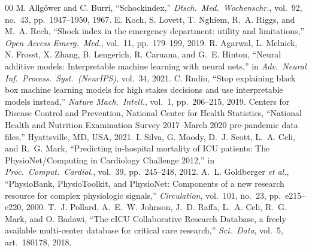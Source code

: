 \documentclass[conference]{IEEEtran}
\begin{document}
\begin{thebibliography}{00}
 M. Allg\"{o}wer and C. Burri, ``Schockindex,'' \textit{Dtsch.\ Med.\ Wochenschr.}, vol.~92, no.~43, pp.~1947--1950, 1967.
 E. Koch, S. Lovett, T. Nghiem, R.~A. Riggs, and M.~A. Rech, ``Shock index in the emergency department: utility and limitations,'' \textit{Open Access Emerg.\ Med.}, vol.~11, pp.~179--199, 2019.
 R. Agarwal, L. Melnick, N. Frosst, X. Zhang, B. Lengerich, R. Caruana, and G.~E. Hinton, ``Neural additive models: Interpretable machine learning with neural nets,'' in \textit{Adv.\ Neural Inf.\ Process.\ Syst.\ (NeurIPS)}, vol.~34, 2021.
 C. Rudin, ``Stop explaining black box machine learning models for high stakes decisions and use interpretable models instead,'' \textit{Nature Mach.\ Intell.}, vol.~1, pp.~206--215, 2019.
 Centers for Disease Control and Prevention, National Center for Health Statistics, ``National Health and Nutrition Examination Survey 2017--March 2020 pre-pandemic data files,'' Hyattsville, MD, USA, 2021.
 I. Silva, G. Moody, D.~J. Scott, L.~A. Celi, and R.~G. Mark, ``Predicting in-hospital mortality of ICU patients: The PhysioNet/Computing in Cardiology Challenge 2012,'' in \textit{Proc.\ Comput.\ Cardiol.}, vol.~39, pp.~245--248, 2012.
 A.~L. Goldberger \textit{et al.}, ``PhysioBank, PhysioToolkit, and PhysioNet: Components of a new research resource for complex physiologic signals,'' \textit{Circulation}, vol.~101, no.~23, pp.~e215--e220, 2000.
 T.~J. Pollard, A.~E.~W. Johnson, J.~D. Raffa, L.~A. Celi, R.~G. Mark, and O. Badawi, ``The eICU Collaborative Research Database, a freely available multi-center database for critical care research,'' \textit{Sci.\ Data}, vol.~5, art.~180178, 2018.
\end{thebibliography}
\end{document}
